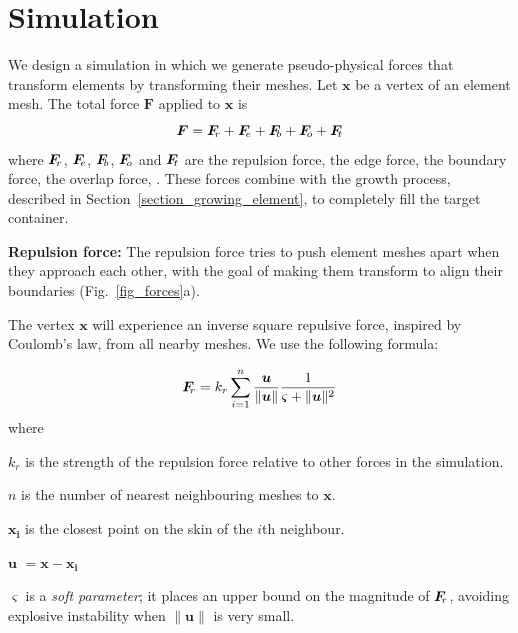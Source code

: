 \section{Simulation}
\label{repulsionpak_simulation}

We design a simulation in which 
we generate pseudo-physical 
forces that transform elements by transforming their meshes.
Let $\bm{x}$ be a vertex of an element mesh. 
The total force $\bm{F}$ applied to $\bm{x}$ is
\begin{equation}
\bm{F} = \simforce{r} + \simforce{e} + \simforce{b} + \simforce{o} + \simforce{t}
\end{equation}
where $\simforce{r}$, $\simforce{e}$, $\simforce{b}$, $\simforce{o}$ and $\simforce{t}$ are 
the repulsion force, the edge force, the boundary force, the overlap force, .
These forces combine with the growth process, described in
Section~\ref{section_growing_element}, to completely fill the target container.



\medskip
\textbf{Repulsion force:} 
The repulsion force tries to push element meshes apart when they approach
each other, with the goal of
making them transform to align their boundaries (Fig.~\ref{fig_forces}a).
 
The vertex $\bm{x}$ will
experience an inverse square repulsive force, inspired by Coulomb's law,
from all nearby meshes.  We use the following formula:

\begin{equation}
\simforce{r} = k_r \sum_{i = 1}^{n} \frac{\bm{u}}{\| \bm{u} \| }\frac{1}{\varsigma  +\| \bm{u} \|^2 }
\end{equation}
where 
\begin{packeddescriptions}
	\item[$k_r$]        is the strength of the repulsion force relative to
						other forces in the simulation.
	\item[$n$]        is the number of nearest neighbouring meshes to $\bm{x}$. 
	\item[$\bm{x_{i}}$] is the closest point on the skin of the $i$th neighbour.
	\item[$\bm{u}$]  $= \bm{x} - \bm{x_{i}}$
	
	
	\item[$\varsigma$]   is a \textit{soft parameter}; it places an upper 
						bound on the magnitude of $\simforce{r}$, avoiding
						explosive instability when $\| \bm{u} \|$ is very small.
\end{packeddescriptions}

